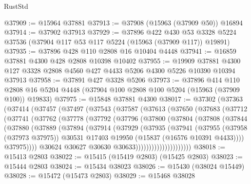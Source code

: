 \begin{lexlean}{RustStd}
\begin{coremodule}
{\begin{coremodule}
{{{{{{{{{{{{{{{{{{{{{{{{{{{{{{{{{{{{{{{{{{{{{{{{{{{{{{{{{{{{@37909 := @15964 @37881
@37913 := @37908 (@15963 (@37909 @50)) @16894
@37914 := @37902 @37913
@37929 := @37896
    @422
    @430
    @53
    @3328
    @5224
    @37536
    (@37904 @117 @53 @117 @5224 (@15963 (@37909 @117)) @19891)
@37935 := @37896 @428 @110 @2808 @16 @10404 @4448
@37941 := @16859 @37881 @4300 @428 @2808 @10398 @10402
@37955 := @19909
    @37881
    @4300
    @127
    @3328
    @2808
    @4560
    @427
    @4433
    @5206
    @4300
    @5226
    @10390
    @10394
    @37913
@37958 := @37891 @427 @3328 @5206
@37973 := @37896
    @414
    @110
    @2808
    @16
    @5204
    @4448
    (@37904 @100 @2808 @100 @5204 (@15963 (@37909 @100)) @19833)
@37975 := @15848 @37881 @4300
@38017 := @37302
    (@37363
      (@37414
        (@37457
          (@37497
            (@37543
              (@37587
                (@37613
                  (@37650
                    (@37683
                      (@37712
                        (@37741
                          (@37762
                            (@37778
                              (@37792
                                (@37796
                                  (@37800
                                    (@37804
                                      (@37808
                                        (@37844
                                          (@37880
                                            (@37889
                                              (@37894
                                                (@37914
                                                  (@37929
                                                    (@37935
                                                      (@37941
                                                        (@37955
                                                          (@37958 (@37973 @37975))
                                                          @30531
                                                          @17403
                                                          @19950
                                                          (@15837 (@16576 @10391 @4433))))
                                                      @37975))))
                                              @30624
                                              @30627
                                              @30630
                                              @30633)))))))))))))))))))))
@38018 := @15413 @2803
@38022 := @15415 (@15419 @2803) (@15425 @2803)
@38023 := @15444 @2803
@38024 := @15434 @38023
@38026 := @15430 (@38024 @15449)
@38028 := @15472 (@15473 @2803)
@38029 := @15468 @38028
}}}}}}}}}}}}}}}}}}}}}}}}}}}}}}}}}}}}}}}}}}}}}}}}}}}}}}}}}}}}
\end{coremodule}}
\end{coremodule}
\end{lexlean}
